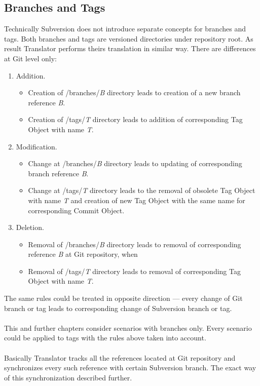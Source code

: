 \subsection{Branches and Tags}
\renewcommand{\figurename}{Diagram}

Technically Subversion does not introduce separate concepts for branches and tags. Both branches and tags are versioned directories under repository root. As result Translator performs theirs translation in similar way. There are differences at Git level only:
\begin{enumerate}
	\compactlist
	\item Addition.
	\begin{itemize}
		\item Creation of /branches/\emph{B} directory leads to creation of a new branch reference \emph{B}.
		\item Creation of /tags/\emph{T} directory leads to addition of corresponding Tag Object with name \emph{T}.
	\end{itemize}
	\item Modification.
	\begin{itemize}
		\item Change at /branches/\emph{B} directory leads to updating of corresponding branch reference \emph{B}.
		\item Change at /tags/\emph{T} directory leads to the removal of obsolete Tag Object with name \emph{T} and creation of new Tag Object with the same name for corresponding Commit Object.
	\end{itemize}
	\item Deletion.
	\begin{itemize}
		\item Removal of /branches/\emph{B} directory leads to removal of corresponding reference \emph{B} at Git repository, when
		\item Removal of /tags/\emph{T} directory leads to removal of corresponding Tag Object with name \emph{T}.
	\end{itemize}
\end{enumerate}

The same rules could be treated in opposite direction --- every change of Git branch or tag leads to corresponding change of Subversion branch or tag.
\\\\
This and further chapters consider scenarios with branches only. Every scenario could be applied to tags with the rules above taken into account.
\\\\
Basically Translator tracks all the references located at Git repository and synchronizes every such reference with certain Subversion branch. The exact way of this synchronization described further.

